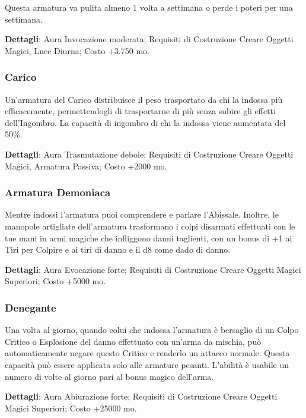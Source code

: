 \begin{multicols}{2}
Questa armatura va pulita almeno 1 volta a settimana o perde i poteri per una settimana.

\textbf{Dettagli}: Aura Invocazione moderata; Requisiti di Costruzione Creare Oggetti Magici, Luce Diurna; Costo +3.750 mo.

\subsubsection*{Carico}

Un'armatura del Carico distribuisce il peso trasportato da chi la indossa più efficacemente, permettendogli di trasportarne di più senza subire gli effetti dell'Ingombro. La capacità di ingombro di chi la indossa viene aumentata del 50\%.

\textbf{Dettagli}: Aura Trasmutazione debole; Requisiti di Costruzione Creare Oggetti Magici, Armatura Passiva; Costo +2000 mo.

\subsubsection*{Armatura Demoniaca}

Mentre indossi l'armatura puoi comprendere e parlare l'Abissale. Inoltre, le manopole artigliate dell'armatura trasformano i colpi disarmati effettuati con le tue mani in armi magiche che infliggono danni taglienti, con un bonus di +1 ai Tiri per Colpire e ai tiri di danno e il d8 come dado di danno.

\textbf{Dettagli}: Aura Evocazione forte; Requisiti di Costruzione Creare Oggetti Magici Superiori; Costo +5000 mo.

\subsubsection*{Denegante}

Una volta al giorno, quando colui che indossa l'armatura è bersaglio di un Colpo Critico o Esplosione del danno effettuato con un'arma da mischia, può automaticamente negare questo Critico e renderlo un attacco normale. Questa capacità può essere applicata solo alle armature pesanti. L'abilità è usabile un numero di volte al giorno pari al bonus magico dell'arma.

\textbf{Dettagli}: Aura Abiurazione forte; Requisiti di Costruzione Creare Oggetti Magici Superiori; Costo +25000 mo.


\end{multicols}
